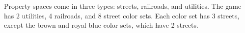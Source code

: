 Property spaces come in three types: streets, railroads, and utilities. The game has 2 utilities, 4 railroads, and 8 street color sets. Each color set has 3 streets, except the brown and royal blue color sets, which have 2 streets.